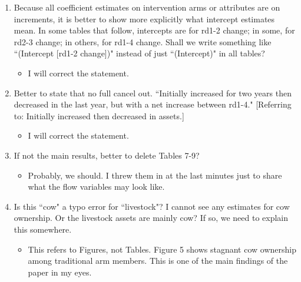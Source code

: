 \begin{enumerate}
\vspace{1.0ex}\setlength{\itemsep}{1.0ex}\setlength{\baselineskip}{12pt}
\item	Because all coefficient estimates on intervention arms or attributes are on increments, it is better to show more explicitly what intercept estimates mean. In some tables that follow, intercepts are for rd1-2 change; in some, for rd2-3 change; in others, for rd1-4 change. Shall we write something like ``(Intercept [rd1-2 change])" instead of just ``(Intercept)" in all tables?
	\begin{itemize}
	\vspace{1.0ex}\setlength{\itemsep}{1.0ex}\setlength{\baselineskip}{12pt}
	\item	I will correct the statement.
	\end{itemize}
\item	Better to state that no full cancel out. ``Initially increased for two years then decreased in the last year, but with a net increase between rd1-4." [Referring to: Initially increased then decreased in assets.]
	\begin{itemize}
	\vspace{1.0ex}\setlength{\itemsep}{1.0ex}\setlength{\baselineskip}{12pt}
	\item	I will correct the statement.
	\end{itemize}
\item	If not the main results, better to delete Tables 7-9?
	\begin{itemize}
	\vspace{1.0ex}\setlength{\itemsep}{1.0ex}\setlength{\baselineskip}{12pt}
	\item	Probably, we should. I threw them in at the last minutes just to share what the flow variables may look like.
	\end{itemize}
\item	Is this ``cow" a typo error for ``livestock"? I cannot see any estimates for cow ownership. Or the livestock assets are mainly cow? If so, we need to explain this somewhere.
	\begin{itemize}
	\vspace{1.0ex}\setlength{\itemsep}{1.0ex}\setlength{\baselineskip}{12pt}
	\item	This refers to Figures, not Tables. Figure 5 shows stagnant cow ownership among traditional arm members. This is one of the main findings of the paper in my eyes.
	\end{itemize}
\end{enumerate}

